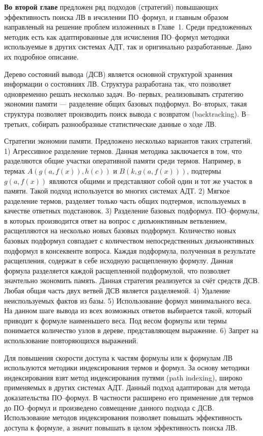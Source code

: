 \documentclass[a4paper]{report}
\begin{document}
\textbf{Во второй главе} предложен ряд подходов (стратегий) повышающих эффективность поиска ЛВ в ичсилении ПО--формул, и главным образом направленый на решение проблем изложенных в Главе~1. Среди предложенных методик есть как адаптированные для исчисления ПО--формул методики используемые в других системах АДТ, так и оригинально разработанные. Дано их подробное описание.

Дерево состояний вывода (ДСВ) является основной структурой хранения информации о состояниях ЛВ. Структура разработана так, что позволяет одновременно решать несколько задач. Во--первых, реализовывать стратегию экономии памяти --- разделение общих базовых подформул. Во--вторых, такая структура позволяет производить поиск вывода с возвратом (backtracking). В--третьих, собирать разнообразные статистические данные о ходе ЛВ. 

Стратегии экономии памяти. Предложено несколько вариантов таких стратегий. 1) Агрессивное разделение термов. Данная методика заключается в том, что разделяются общие участки оперативной памяти среди термов. Например, в термах $A(g(a,f(x)),h(c))$ и $B(k,g(a,f(x)))$, подтермы $g(a,f(x))$ являются общими и представляют собой один и тот же участок в памяти. Такой подход используется во многих системах АДТ. 2) Мягкое разделение термов, разделяет только часть общих подтермов, используемых в качестве ответных подстановок. 3) Разделение базовых подформул. ПО--формулы, в которых производится ответ на вопрос с дизъюнктивным ветвлением, расщепляются на несколько новых базовых подформул. Количество новых базовых подформул совпадает с количеством непосредственных дизъюнктивных подформул в консеквенте вопроса. Каждая подформула, полученная в результате расщепления, содержат в себе исходную расщепленную формулу. Данная формула разделяется каждой расщепленной подформулой, что позволяет значтельно экономить память. Данная стратегия реализуется за счёт средств ДСВ. Любая общая часть двух ветвей ДСВ является разделяемой. 4) Удаление неиспользуемых фактов из базы. 5) Использование формул минимального веса. На данном шаге вывода из всех возможных ответов выбирается такой, который приводит к формуле наименьшего веса. Под весом формулы или термы понимается количество узлов в дереве, представляющем выражение. 6) Запрет на использование повторяющихся выражений.

Для повышения скорости доступа к частям формулы или к формулам ЛВ используются методики индексирования термов и формул. За основу методики индексирования взят метод индексирования путями (path indexing), широко применяемых в других системах АДТ. Данный подход адаптирован для метода доказательства ПО--формул. В частности расширено его применение для термов до ПО--формул и произведено совмещение данного подхода с ДСВ. Использование методов индексирования позволяет повышать эффективность доступа к формуле, а значит повышать в целом эффективность поиска ЛВ.
\end{document}
